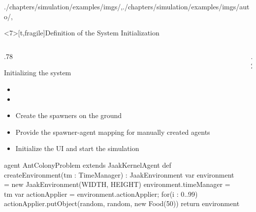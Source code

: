\begin{graphicspathcontext}{{./chapters/simulation/examples/imgs/},{./chapters/simulation/examples/imgs/auto/},\old}
\begin{frame}<7>[t,fragile]{Definition of the System Initialization \insertcontinuationtext}
	\vspace{-.5cm}
	\smaller
	\begin{columns}
		\begin{column}[t]{.78\linewidth}
			{\smaller
			\begin{block}{Initializing the system}
				\begin{itemize}
				\item {}
				\item {}
				\item Create the spawners on the ground
				\item Provide the spawner-agent mapping for manually created agents
				\item Initialize the UI and start the simulation
				\end{itemize}
			\end{block}}
			\begin{sarllisting}[basicstyle=\scriptsize]
agent AntColonyProblem extends JaakKernelAgent {
  def createEnvironment(tm : TimeManager) : JaakEnvironment {
    var environment = new JaakEnvironment(WIDTH, HEIGHT)
    environment.timeManager = tm
    var actionApplier = environment.actionApplier;
    for(i : 0..99)
      actionApplier.putObject(random, random,
      	new Food(50))
    return environment
  }
}
			\end{sarllisting}
		\end{column}
		\begin{column}[t]{.2\linewidth}
		\end{column}
	\end{columns}
\end{frame}


\end{graphicspathcontext}
